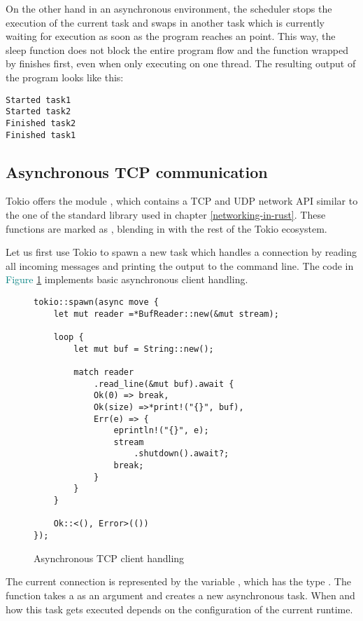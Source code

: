 On the other hand in an asynchronous environment, the scheduler stops the execution of the current task and swaps in
another task which is currently waiting for execution as soon as the program reaches an  point. This way,
the sleep function does not block the entire program flow and the function wrapped by  finishes first,
even when only executing on one thread. The resulting output of the program looks like this:

\begin{verbatim}
Started task1
Started task2
Finished task2
Finished task1
\end{verbatim}

\subsection{Asynchronous TCP communication}
Tokio offers the module , which contains a TCP and UDP network API similar to the one of the standard
library used in chapter \ref{networking-in-rust}. These functions are marked as , blending in with
the rest of the Tokio ecosystem.

Let us first use Tokio to spawn a new task which handles a connection by reading all incoming messages and printing the
output to the command line. The code in \textcolor{teal}{Figure \ref{async-tcp-client-handeling}} implements basic
asynchronous client handling.

\begin{figure}[ht]
    \begin{verbatim}
tokio::spawn(async move {
    let mut reader =*BufReader::new(&mut stream);

    loop {
        let mut buf = String::new();

        match reader
            .read_line(&mut buf).await {
            Ok(0) => break,
            Ok(size) =>*print!("{}", buf),
            Err(e) => {
                eprintln!("{}", e);
                stream
                    .shutdown().await?;
                break;
            }
        }
    }

    Ok::<(), Error>(())
});
    \end{verbatim}
    \caption{Asynchronous TCP client handling}
    \label{async-tcp-client-handeling}
\end{figure}

The current connection is represented by the variable , which has the type .
The function  takes a  as an argument and creates a new asynchronous task. When and how
this task gets executed depends on the configuration of the current runtime.

